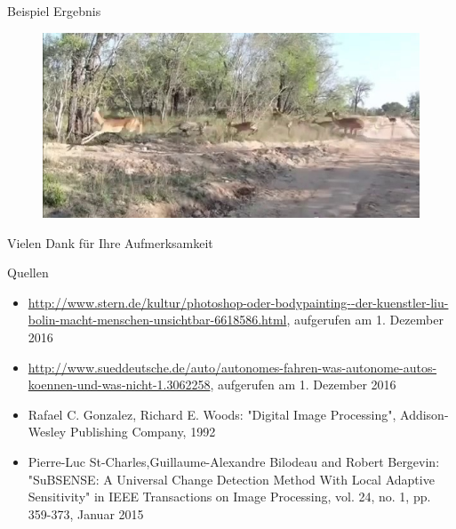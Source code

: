 \documentclass[hyperref={pdfpagelabels=false}]{beamer}
\begin{document}
\begin{frame}[t]{Beispiel Ergebnis}
	\vspace{1.3em}
	\begin{figure}
		\centering
		\includegraphics[width=0.8\linewidth]{Abbildungen/Einstieg/original_small9.jpg}
	\end{figure}
\end{frame}

\begin{frame}
	\centering
	\vspace{3em}
	\large{Vielen Dank für Ihre Aufmerksamkeit}
\end{frame}


\begin{frame}[t]{Quellen}
	\begin{itemize}
		\item \url{http://www.stern.de/kultur/photoshop-oder-bodypainting--der-kuenstler-liu-bolin-macht-menschen-unsichtbar-6618586.html}, aufgerufen am 1. Dezember 2016
		\item \url{http://www.sueddeutsche.de/auto/autonomes-fahren-was-autonome-autos-koennen-und-was-nicht-1.3062258}, aufgerufen am 1. Dezember 2016
		\item Rafael C. Gonzalez, Richard E. Woods: "Digital Image Processing", Addison-Wesley Publishing Company, 1992
		\item Pierre-Luc St-Charles,Guillaume-Alexandre Bilodeau and Robert Bergevin: "SuBSENSE: A Universal Change Detection Method With Local Adaptive Sensitivity" in IEEE Transactions on Image Processing, vol. 24, no. 1, pp. 359-373, Januar 2015
	\end{itemize}
\end{frame}
\end{document}
